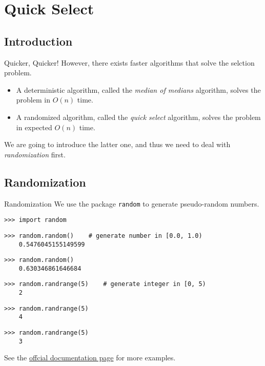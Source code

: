 \documentclass{beamer}
\begin{document}
\section{Quick Select}
\subsection{Introduction}
\begin{frame}{Quicker, Quicker!}
  However, there exists faster algorithms that solve the selction problem.
  \pause
  \begin{itemize}
    \item A deterministic algorithm, called the \emph{median of medians}
    algorithm, solves the problem in $O(n)$ time. \pause
    \item A randomized algorithm, called the \emph{quick select} algorithm,
    solves the problem in expected $O(n)$ time. \pause
  \end{itemize}
  We are going to introduce the latter one, and thus we need to deal with
  \emph{randomization} first.
\end{frame}

\subsection{Randomization}
\begin{frame}[fragile]{Randomization}
  We use the package \lstinline{random} to generate pseudo-random numbers.
  \pause
  \begin{block}{}
    \scriptsize
    \begin{lstlisting}[gobble=4]
    >>> import random
    \end{lstlisting}
    \pause
  \end{block}

  \begin{block}{}
    \scriptsize
    \begin{lstlisting}[gobble=4]
    >>> random.random()    # generate number in [0.0, 1.0)
    0.5476045155149599
    \end{lstlisting}
    \pause
    \begin{lstlisting}[gobble=4]
    >>> random.random()
    0.630346861646684
    \end{lstlisting}
    \pause
  \end{block}

  \begin{block}{}
    \scriptsize
    \begin{lstlisting}[gobble=4]
    >>> random.randrange(5)    # generate integer in [0, 5)
    2
    \end{lstlisting}
    \pause
    \begin{lstlisting}[gobble=4]
    >>> random.randrange(5)
    4
    \end{lstlisting}
    \pause
    \begin{lstlisting}[gobble=4]
    >>> random.randrange(5)
    3
    \end{lstlisting}
    \pause
  \end{block}
  See the
  \href{https://docs.python.org/3/library/random.html}
       {offcial documentation page}
  for more examples.
\end{frame}
\end{document}
